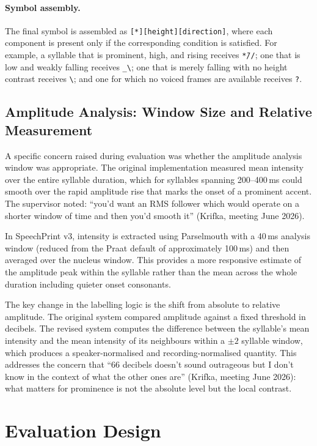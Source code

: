 \paragraph{Symbol assembly.}
The final symbol is assembled as \texttt{[*][height][direction]}, where each
component is present only if the corresponding condition is satisfied. For
example, a syllable that is prominent, high, and rising receives
\texttt{*{\={}}//}; one that is low and weakly falling receives
\texttt{\_\textbackslash}; one that is merely falling with no height contrast
receives \texttt{\textbackslash}; and one for which no voiced frames are
available receives \texttt{?}.

\subsection{Amplitude Analysis: Window Size and Relative Measurement}
\label{sec:amplitude}

A specific concern raised during evaluation was whether the amplitude analysis
window was appropriate. The original implementation measured mean intensity over
the entire syllable duration, which for syllables spanning 200--400\,ms could
smooth over the rapid amplitude rise that marks the onset of a prominent accent.
The supervisor noted: ``you'd want an RMS follower which would operate on a
shorter window of time and then you'd smooth it'' (Krifka, meeting June 2026).

In SpeechPrint v3, intensity is extracted using Parselmouth with a 40\,ms
analysis window (reduced from the Praat default of approximately 100\,ms) and
then averaged over the nucleus window. This provides a more responsive estimate
of the amplitude peak within the syllable rather than the mean across the whole
duration including quieter onset consonants.

The key change in the labelling logic is the shift from absolute to relative
amplitude. The original system compared amplitude against a fixed threshold in
decibels. The revised system computes the difference between the syllable's mean
intensity and the mean intensity of its neighbours within a $\pm 2$ syllable
window, which produces a speaker-normalised and recording-normalised quantity.
This addresses the concern that ``66 decibels doesn't sound outrageous but I
don't know in the context of what the other ones are'' (Krifka, meeting June 2026):
what matters for prominence is not the absolute level but the local contrast.

\section{Evaluation Design}
\label{sec:eval_design}

